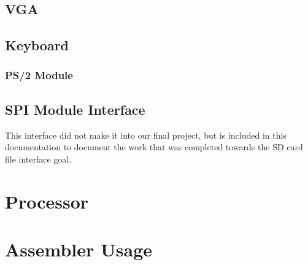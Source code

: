 \documentclass[11pt]{article}
\begin{document}
\subsection{VGA}

\subsection{Keyboard}

\subsubsection{PS/2 Module}

\subsection{SPI Module Interface}
This interface did not make it into our final project, but is included in this documentation to document the work that was completed towards the SD card file interface goal.

\section{Processor}

\section{Assembler Usage}

\end{document}
